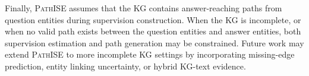 \documentclass{article}
\newcommand{\framework}{\textsc{PathISE}\xspace}
\begin{document}
Finally, \framework{} assumes that the KG contains answer-reaching paths from question entities during supervision construction.
When the KG is incomplete, or when no valid path exists between the question entities and answer entities, both supervision estimation and path generation may be constrained.
Future work may extend \framework{} to more incomplete KG settings by incorporating missing-edge prediction, entity linking uncertainty, or hybrid KG-text evidence.



% 
\end{document}
